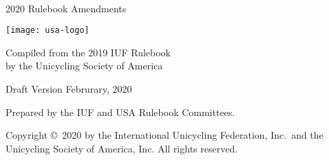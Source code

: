 \begin{titlepage}
\centering
\ \\

{\Huge 2020 Rulebook Amendments}
\vspace{5mm}

\texttt{[image: usa-logo]}

\vspace{5mm}
{\Large Compiled from the 2019 IUF Rulebook\\ }
\vspace{3mm}
{\Large by the Unicycling Society of America}

\vspace{8mm}
{\Large Draft Version \quad Februrary, 2020}

\vspace{40mm}
Prepared by the IUF and USA Rulebook Committees.

\vspace{5mm}
{\small Copyright \copyright\ 2020 by the International Unicycling Federation, Inc.\ and the Unicycling Society of America, Inc. All rights reserved.}

\end{titlepage}
